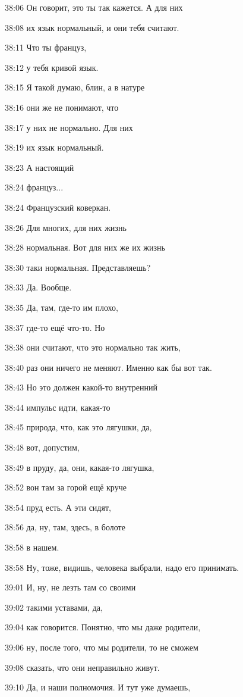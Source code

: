 38:06
Он говорит, это ты так кажется. А для них

38:08
их язык нормальный, и они тебя считают.

38:11
Что ты француз,

38:12
у тебя кривой язык.

38:15
Я такой думаю, блин, а в натуре

38:16
они же не понимают, что

38:17
у них не нормально. Для них

38:19
их язык нормальный.

38:23
А настоящий

38:24
француз...

38:24
Французский коверкан.

38:26
Для многих, для них жизнь

38:28
нормальная. Вот для них же их жизнь

38:30
таки нормальная. Представляешь?

38:33
Да. Вообще.

38:35
Да, там, где-то им плохо,

38:37
где-то ещё что-то. Но

38:38
они считают, что это нормально так жить,

38:40
раз они ничего не меняют. Именно как бы вот так.

38:43
Но это должен какой-то внутренний

38:44
импульс идти, какая-то

38:45
природа, что, как это лягушки, да,

38:48
вот, допустим,

38:49
в пруду, да, они, какая-то лягушка,

38:52
вон там за горой ещё круче

38:54
пруд есть. А эти сидят,

38:56
да, ну, там, здесь, в болоте

38:58
в нашем.

38:58
Ну, тоже, видишь, человека выбрали, надо его принимать.

39:01
И, ну, не лезть там со своими

39:02
такими уставами, да,

39:04
как говорится. Понятно, что мы даже родители,

39:06
ну, после того, что мы родители, то не сможем

39:08
сказать, что они неправильно живут.

39:10
Да, и наши полномочия. И тут уже думаешь,

